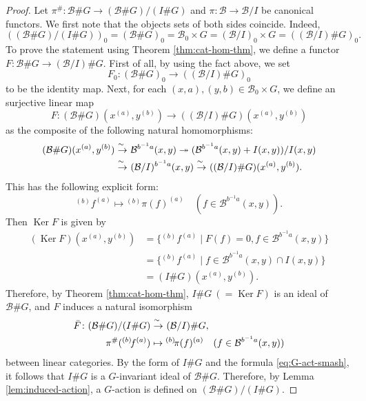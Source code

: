 \documentclass{surv-l}
\numberwithin{equation}{chapter}
\numberwithin{figure}{chapter}
\theoremstyle{plain}
\theoremstyle{definition}
\theoremstyle{remark}
\newcommand{\isoto}{\
  \raise.8ex\hbox{$^{\sim}$}\kern-.7em\hbox{$\to$}\ }
\DeclareMathOperator{\Ker}{Ker}
\def\smor(#1,#2,#3){{}^{(#1)}\!#2^{(#3)}}
\begin{document}
\begin{proof}
Let $\pi^{\#}\colon \mathcal{B}\# G \to (\mathcal{B}\# G)/(I \# G)$ and $\pi\colon \mathcal{B} \to \mathcal{B}/I$
be canonical functors.
We first note that the objects sets of both sides coincide.
Indeed,
\begin{equation*}
((\mathcal{B}\# G)/(I\# G))_0 = (\mathcal{B}\# G)_0 = \mathcal{B}_0 \times G = (\mathcal{B}/I)_0 \times G
= ((\mathcal{B}/I) \# G)_0.
\end{equation*}
To prove the statement using Theorem \ref{thm:cat-hom-thm},
we define a functor $F \colon \mathcal{B} \# G \to (\mathcal{B}/I)\# G$.
First of all, by using the fact above, we set
\[
F_0 \colon (\mathcal{B} \# G)_0 \to ((\mathcal{B}/I)\# G)_0
\]
to be the identity map.
Next, for each $(x, a), (y, b) \in \mathcal{B}_0 \times G$,
we define an surjective linear map
\[
F \colon (\mathcal{B} \# G)(x^{(a)}, y^{(b)}) \to ((\mathcal{B}/I)\# G)(x^{(a)}, y^{(b)})
\]
as the composite of the following natural homomorphisms:
\[
\begin{aligned}
(\mathcal{B} \# G)(x^{(a)}, y^{(b)}) &\isoto \mathcal{B}^{b^{-1} a}(x, y)
\twoheadrightarrow (\mathcal{B}^{b^{-1} a}(x, y) + I(x,y))/I(x, y)\\
&\isoto (\mathcal{B}/I)^{b^{-1} a}(x, y)
\isoto ((\mathcal{B}/I)\# G)(x^{(a)}, y^{(b)}).
\end{aligned}
\]
This has the following explicit form:
\[
\smor(b,f,a) \mapsto \smor(b,\pi(f),a)\quad
(f \in \mathcal{B}^{b^{-1} a}(x, y)).
\]
Then $\Ker F$ is given by
\[
\begin{aligned}
(\Ker F)(x^{(a)}, y^{(b)}) &= \{\smor(b,f,a)  \mid
F(f) = 0, f \in \mathcal{B}^{b^{-1} a}(x, y) \}\\
&= \{\smor(b,f,a)  \mid f \in \mathcal{B}^{b^{-1} a}(x, y) \cap I(x, y) \}\\
&= (I\# G)(x^{(a)}, y^{(b)}).
\end{aligned}
\]
Therefore, by Theorem \ref{thm:cat-hom-thm},
$I\# G\ (= \Ker F)$ is an ideal of $\mathcal{B}\# G$, and
$F$ induces a natural isomorphism
\begin{equation}
\begin{aligned}\label{eq:identify}
\bar{F}\colon (\mathcal{B}\# G)/(I\# G) &\isoto (\mathcal{B}/I)\# G,\\
\pi^\#(\smor(b,f,a)) &\mapsto \smor(b,\pi(f),a)\quad
(f \in \mathcal{B}^{b^{-1} a}(x, y))
\end{aligned}
\end{equation}
between linear categories.
By the form of $I\# G$ and the formula \eqref{eq:G-act-smash},
it follows that $I\# G$ is a $G$-invariant ideal of $\mathcal{B}\# G$.
Therefore, by Lemma \ref{lem:induced-action}, a $G$-action
is defined on $(\mathcal{B}\# G)/(I\# G)$.


\end{proof}
\end{document}
